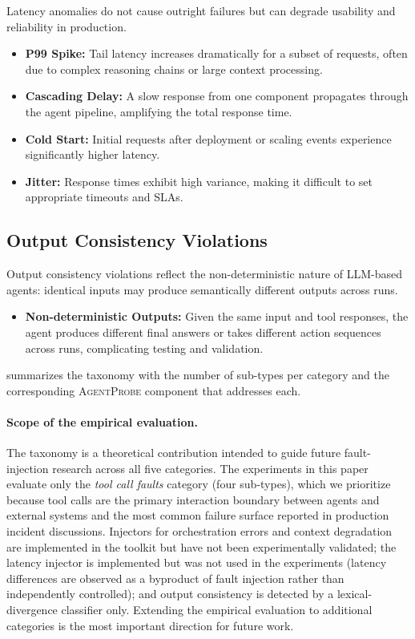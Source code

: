 \documentclass[make,article,submit,moreauthors,pdftex]{mdpi}
\providecommand{\agentprobe}{\textsc{AgentProbe}}
\begin{document}
Latency anomalies do not cause outright failures but can degrade usability and reliability in production.

\begin{itemize}
  \item \textbf{P99 Spike:} Tail latency increases dramatically for a subset of requests, often due to complex reasoning chains or large context processing.
  \item \textbf{Cascading Delay:} A slow response from one component propagates through the agent pipeline, amplifying the total response time.
  \item \textbf{Cold Start:} Initial requests after deployment or scaling events experience significantly higher latency.
  \item \textbf{Jitter:} Response times exhibit high variance, making it difficult to set appropriate timeouts and SLAs.
\end{itemize}

\subsection{Output Consistency Violations}

Output consistency violations reflect the non-deterministic nature of LLM-based agents: identical inputs may produce semantically different outputs across runs.

\begin{itemize}
  \item \textbf{Non-deterministic Outputs:} Given the same input and tool responses, the agent produces different final answers or takes different action sequences across runs, complicating testing and validation.
\end{itemize}

 summarizes the taxonomy with the number of sub-types per category and the corresponding \agentprobe{} component that addresses each.

\paragraph{Scope of the empirical evaluation.} {The taxonomy is a theoretical contribution intended to guide future fault-injection research across all five categories. The experiments in this paper evaluate only the \emph{tool call faults} category (four sub-types), which we prioritize because tool calls are the primary interaction boundary between agents and external systems and the most common failure surface reported in production incident discussions. Injectors for orchestration errors and context degradation are implemented in the toolkit but have not been experimentally validated; the latency injector is implemented but was not used in the experiments (latency differences are observed as a byproduct of fault injection rather than independently controlled); and output consistency is detected by a lexical-divergence classifier only. Extending the empirical evaluation to additional categories is the most important direction for future work.}
\end{document}
